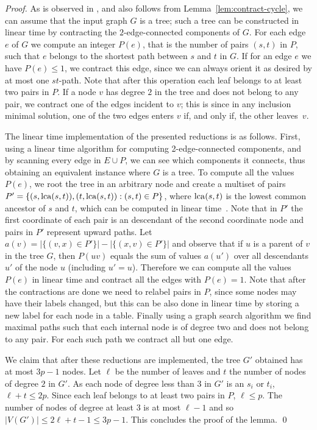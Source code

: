 \documentclass[envcountsame]{llncs}
\begin{document}
\begin{proof}
As is observed in \cite{HM}, and also follows from Lemma~\ref{lem:contract-cycle},
we can assume that the input graph $G$ is a tree; such a tree can be constructed in linear time
by contracting the $2$-edge-connected components of $G$.
For each edge $e$ of $G$ we compute an integer $P(e)$,
that is the number of pairs $(s,t)$ in $P$, such that $e$
belongs to the shortest path between $s$ and $t$ in $G$.
If for an edge $e$ we have $P(e) \le 1$, we contract this edge,
since we can always orient it as desired by at most one $st$-path.
Note that after this operation each leaf belongs to at least two pairs in $P$.
If a node $v$ has degree $2$ in the tree and does not belong to any pair,
we contract one of the edges incident to $v$; this is since in any inclusion minimal solution,
one of the two edges enters $v$ if, and only if, the other leaves~$v$. 

The linear time implementation of the presented reductions is as follows.
First, using a linear time algorithm for computing 2-edge-connected components,
and by scanning every edge in $E \cup P$, we can see which components it connects,
thus obtaining an equivalent instance where $G$ is a tree.
To compute all the values $P(e)$, we root the tree in an arbitrary node
and create a multiset of pairs $P'=\{(s,{\rm lca}(s,t)), (t,{\rm lca}(s,t)): (s,t) \in P\}$,
where ${\rm lca}(s,t)$ is the lowest common ancestor of $s$ and $t$,
which can be computed in linear time~\cite{HT}.
Note that in $P'$ the first coordinate of each pair is an descendant of the second coordinate node
and pairs in $P'$ represent upward paths.
Let $a(v) = |\{(v,x) \in P'\}| - |\{(x,v) \in P'\}|$ and observe that 
if $u$ is a parent of $v$ in the tree $G$, then $P(uv)$ equals
the sum of values $a(u')$ over all descendants $u'$ of the node $u$ (including $u'=u$).
Therefore we can compute all the values $P(e)$ in linear time
and contract all the edges with $P(e)=1$.
Note that after the contractions are done we need to relabel pairs in $P$,
since some nodes may have their labels changed,
but this can be also done in linear time by storing a new label for each node
in a table.
Finally using a graph search algorithm we find maximal paths such
that each internal node is of degree two and does not belong to any pair.
For each such path we contract all but one edge.

We claim that after these reductions are implemented, the tree $G'$ obtained has at most $3p-1$ nodes. 
Let $\ell$ be the number of leaves and $t$ the number of nodes of degree $2$ in $G'$. 
As each node of degree less than $3$ in $G'$ is an $s_i$ or $t_i$, $\ell+t\leq 2p$.
Since each leaf belongs to at least two pairs in $P$, $\ell \le p$.
The number of nodes of degree at least $3$ is at most 
$\ell-1$ and so $|V(G')|\leq 2\ell+t-1\leq 3p-1$.
This concludes the proof of the lemma.
\qed
\end{proof}
\end{document}
